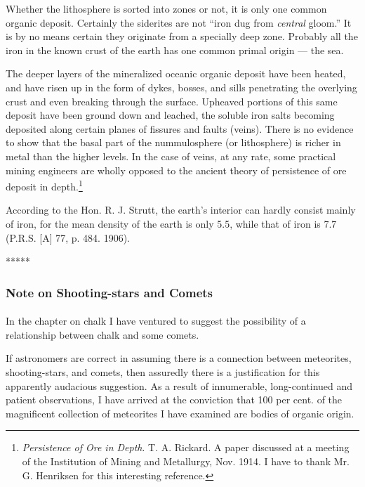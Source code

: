 \documentclass[a4paper, 12pt, oneside]{article}
\begin{document}
Whether the lithosphere is sorted into zones or not, it is only one common organic deposit. Certainly the siderites are not ``iron dug from \emph{central} gloom.'' It is by no means certain they originate from a specially deep zone. Probably all the iron in the known crust of the earth has one common primal origin --- the sea.

The deeper layers of the mineralized oceanic organic deposit have been heated, and have risen up in the form of dykes, bosses, and sills penetrating the overlying crust and even breaking through the surface. Upheaved portions of this same deposit have been ground down and leached, the soluble iron salts becoming deposited along certain planes of fissures and faults (veins). There is no evidence to show that the basal part of the nummulosphere (or lithosphere) is richer in metal than the higher levels. In the case of veins, at any rate, some practical mining engineers are wholly opposed to the ancient theory of persistence of ore deposit in depth.\footnote{\emph{Persistence of Ore in Depth}. T. A. Rickard. A paper discussed at a meeting of the Institution of Mining and Metallurgy, Nov. 1914. I have to thank Mr. G. Henriksen for this interesting reference.}

According to the Hon. R. J. Strutt, the earth's interior can hardly consist mainly of iron, for the mean density of the earth is only 5.5, while that of iron is 7.7 (P.R.S. [A] 77, p. 484. 1906).

\centerline{*\hspace{15mm}*\hspace{15mm}*\hspace{15mm}*\hspace{15mm}*}
\bigskip

\subsubsection{Note on Shooting-stars and Comets}
\paragraph{}
In the chapter on chalk I have ventured to suggest the possibility of a relationship between chalk and some comets.

If astronomers are correct in assuming there is a connection between meteorites, shooting-stars, and comets, then assuredly there is a justification for this apparently audacious suggestion. As a result of innumerable, long-continued and patient observations, I have arrived at the conviction that 100 per cent. of the magnificent collection of meteorites I have examined are bodies of organic origin.
\end{document}
